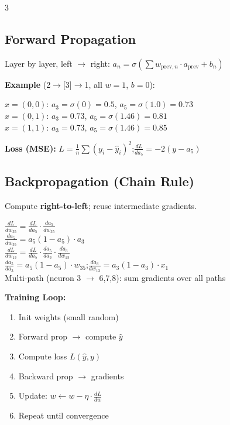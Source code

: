 \documentclass[8pt,letterpaper]{extarticle}
\begin{document}
\begin{multicols}{3}
\subsection{Forward Propagation}
Layer by layer, left $\to$ right: $a_n = \sigma\!\left(\sum w_{\text{prev},n}\cdot a_\text{prev} + b_n\right)$

\textbf{Example} (2$\to$[3]$\to$1, all $w=1$, $b=0$):
\begin{formulabox}
$x=(0,0)$: $a_3{=}\sigma(0){=}0.5$,\; $a_5{=}\sigma(1.0){=}0.73$\\
$x=(0,1)$: $a_3{=}0.73$,\; $a_5{=}\sigma(1.46){=}0.81$\\
$x=(1,1)$: $a_3{=}0.73$,\; $a_5{=}\sigma(1.46){=}0.85$
\end{formulabox}

\textbf{Loss (MSE):} $L = \frac{1}{n}\sum(y_i - \hat{y}_i)^2$;\quad $\frac{dL}{da_5} = -2(y - a_5)$

\subsection{Backpropagation (Chain Rule)}
Compute \textbf{right-to-left}; reuse intermediate gradients.
\begin{formulabox}
$\frac{dL}{dw_{35}} = \frac{dL}{da_5}\cdot\frac{da_5}{dw_{35}}$\\
$\frac{da_5}{dw_{35}} = a_5(1-a_5)\cdot a_3$\\[3pt]
$\frac{dL}{dw_{13}} = \frac{dL}{da_5}\cdot\frac{da_5}{da_3}\cdot\frac{da_3}{dw_{13}}$\\
$\frac{da_5}{da_3} = a_5(1-a_5)\cdot w_{35}$;\quad $\frac{da_3}{dw_{13}} = a_3(1-a_3)\cdot x_1$\\[3pt]
Multi-path (neuron 3 $\to$ 6,7,8): sum gradients over all paths
\end{formulabox}

\textbf{Training Loop:}
\begin{enumerate}
  \item Init weights (small random)
  \item Forward prop $\to$ compute $\hat{y}$
  \item Compute loss $L(\hat{y}, y)$
  \item Backward prop $\to$ gradients
  \item Update: $w \leftarrow w - \eta\cdot\frac{dL}{dw}$
  \item Repeat until convergence
\end{enumerate}


\end{multicols}
\end{document}
